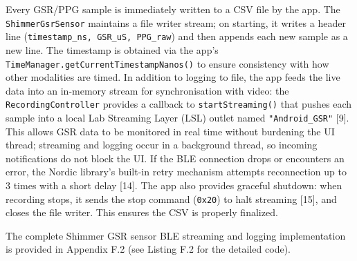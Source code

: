 Every GSR/PPG sample is immediately written to a CSV file by the app. The \texttt{ShimmerGsrSensor} maintains a file writer stream; on starting, it writes a header line (\texttt{timestamp\_ns, GSR\_uS, PPG\_raw}) and then appends each new sample as a new line. The timestamp is obtained via the app's \texttt{TimeManager.getCurrentTimestampNanos()} to ensure consistency with how other modalities are timed. In addition to logging to file, the app feeds the live data into an in-memory stream for synchronisation with video: the \texttt{RecordingController} provides a callback to \texttt{startStreaming()} that pushes each sample into a local Lab Streaming Layer (LSL) outlet named \texttt{"Android\_GSR"} [9]. This allows GSR data to be monitored in real time without burdening the UI thread; streaming and logging occur in a background thread, so incoming notifications do not block the UI. If the BLE connection drops or encounters an error, the Nordic library's built-in retry mechanism attempts reconnection up to 3 times with a short delay [14]. The app also provides graceful shutdown: when recording stops, it sends the stop command (\texttt{0x20}) to halt streaming [15], and closes the file writer. This ensures the CSV is properly finalized.

The complete Shimmer GSR sensor BLE streaming and logging implementation is provided in Appendix F.2 (see Listing F.2 for the detailed code).

